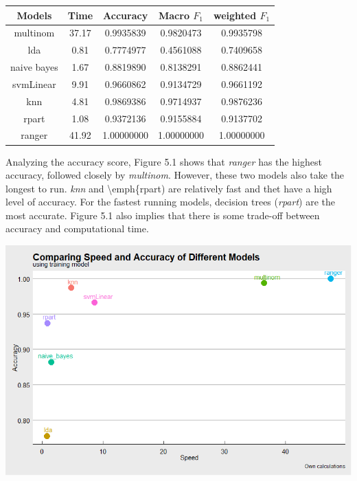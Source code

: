 \documentclass[11pt,preprint, authoryear]{elsarticle}
\let\origfigure\figure
\let\endorigfigure\endfigure
\renewenvironment{figure}[1][2] {
    \expandafter\origfigure\expandafter[H]
} {
    \endorigfigure
}
\numberwithin{equation}{section}
\numberwithin{figure}{section}
\numberwithin{table}{section}
\begin{document}
\begin{center}
\begin{tabular}{| c| c| c |c| c|}
\hline
\textbf{Models} & \textbf{Time} & \textbf{Accuracy} & \textbf{Macro \(F_1\)} & \textbf{weighted \(F_1\)} \\
\hline
multinom & 37.17 & 0.9935839 & 0.9820473 & 0.9935798 \\
\hline
lda & 0.81 & 0.7774977 & 0.4561088 & 0.7409658 \\
\hline
naive bayes & 1.67 & 0.8819890 & 0.8138291 & 0.8862441 \\
\hline
svmLinear & 9.91 & 0.9660862 & 0.9134729 & 0.9661192 \\
\hline
knn & 4.81 & 0.9869386 & 0.9714937 & 0.9876236 \\
\hline 
rpart & 1.08 & 0.9372136 & 0.9155884 & 0.9137702 \\
\hline 
ranger & 41.92 & 1.00000000 & 1.00000000 & 1.00000000 \\
\hline
\end{tabular}
\end{center}

Analyzing the accuracy score, Figure 5.1 shows that \emph{ranger} has
the highest accuracy, followed closely by \emph{multinom}. However,
these two models also take the longest to run. \emph{knn} and
\textbackslash emph\{rpart) are relatively fast and thet have a high
level of accuracy. For the fastest running models, decision trees
(\emph{rpart}) are the most accurate. Figure 5.1 also implies that there
is some trade-off between accuracy and computational time.

\begin{figure}
\centerline{\includegraphics[scale=0.65]{accuracy.png}}
\caption{Speed versus Accuracy}
\end{figure}
\end{document}
